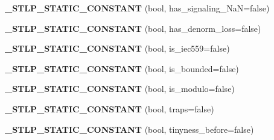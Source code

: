 \begin{DoxyCompactItemize}
{\bfseries \+\_\+\+S\+T\+L\+P\+\_\+\+S\+T\+A\+T\+I\+C\+\_\+\+C\+O\+N\+S\+T\+A\+NT} (bool, has\+\_\+signaling\+\_\+\+NaN=false)
\item 
\mbox{\label{class___numeric__limits__base_a9a062cee7e4d70cc0736fc61af1f4e81}} 
{\bfseries \+\_\+\+S\+T\+L\+P\+\_\+\+S\+T\+A\+T\+I\+C\+\_\+\+C\+O\+N\+S\+T\+A\+NT} (bool, has\+\_\+denorm\+\_\+loss=false)
\item 
\mbox{\label{class___numeric__limits__base_a24b05e91aa5bc06e4ae395aa64463a17}} 
{\bfseries \+\_\+\+S\+T\+L\+P\+\_\+\+S\+T\+A\+T\+I\+C\+\_\+\+C\+O\+N\+S\+T\+A\+NT} (bool, is\+\_\+iec559=false)
\item 
\mbox{\label{class___numeric__limits__base_a9bb1e251138f113df2d63037c98ca683}} 
{\bfseries \+\_\+\+S\+T\+L\+P\+\_\+\+S\+T\+A\+T\+I\+C\+\_\+\+C\+O\+N\+S\+T\+A\+NT} (bool, is\+\_\+bounded=false)
\item 
\mbox{\label{class___numeric__limits__base_ad4e8af0668048dfa59fbe29d489b7bd9}} 
{\bfseries \+\_\+\+S\+T\+L\+P\+\_\+\+S\+T\+A\+T\+I\+C\+\_\+\+C\+O\+N\+S\+T\+A\+NT} (bool, is\+\_\+modulo=false)
\item 
\mbox{\label{class___numeric__limits__base_a3efcab2838da4df587955bc896c417d2}} 
{\bfseries \+\_\+\+S\+T\+L\+P\+\_\+\+S\+T\+A\+T\+I\+C\+\_\+\+C\+O\+N\+S\+T\+A\+NT} (bool, traps=false)
\item 
\mbox{\label{class___numeric__limits__base_a2a79bffd93fdff651fc88d313caff39d}} 
{\bfseries \+\_\+\+S\+T\+L\+P\+\_\+\+S\+T\+A\+T\+I\+C\+\_\+\+C\+O\+N\+S\+T\+A\+NT} (bool, tinyness\+\_\+before=false)
\end{DoxyCompactItemize}
